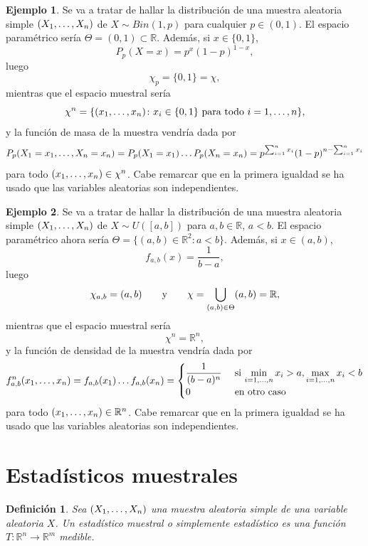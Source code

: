 \documentclass[11pt]{report}
\newtheorem{definition}{Definición}
\theoremstyle{definition}
\newtheorem{example}{Ejemplo}
\newcommand{\R}{\mathbb R}
\begin{document}
\begin{example}
Se va a tratar de hallar la distribución de una muestra aleatoria simple $(X_1,\mathellipsis,X_n)$ de $X \sim Bin(1,p)$ para cualquier $p \in (0,1)$. El espacio paramétrico sería $\Theta = (0,1) \subset \R$. Además, si $x \in \{0,1\}$,
\[P_p(X=x)=p^x(1-p)^{1-x},\]
luego
\[\chi_p = \{0,1\} = \chi,\]
mientras que el espacio muestral sería
\[\chi^n = \{(x_1,\mathellipsis,x_n) \colon x_i \in \{0,1\} \textup{ para todo } i =1,\mathellipsis,n\},\]
y la función de masa de la muestra vendría dada por
\[P_p(X_1=x_1,\mathellipsis,X_n=x_n) = P_p(X_1=x_1)\mathellipsis P_p(X_n=x_n) = p^{\sum_{i=1}^n x_i}(1-p)^{n-\sum_{i=1}^nx_i}\]
para todo $(x_1,\mathellipsis,x_n) \in \chi^n$. Cabe remarcar que en la primera igualdad se ha usado que las variables aleatorias son independientes.
\end{example}

\begin{example}
Se va a tratar de hallar la distribución de una muestra aleatoria simple $(X_1,\mathellipsis,X_n)$ de $X \sim U([a,b])$ para $a,b\in \R$, $a<b$. El espacio paramétrico ahora sería $\Theta = \{(a,b) \in \R^2 \colon a<b\}$. Además, si $x \in (a,b)$,
\[f_{a,b}(x)=\frac{1}{b-a},\]
luego
\[\chi_{a,b} = (a,b) \qquad \textup{y} \qquad \chi = \bigcup_{(a,b) \in \Theta} (a,b) = \R,\]
mientras que el espacio muestral sería
\[\chi^n = \R^n,\]
y la función de densidad de la muestra vendría dada por
\[f_{a,b}^n(x_1,\mathellipsis,x_n) = f_{a,b}(x_1)\mathellipsis f_{a,b}(x_n) = \begin{cases}
    \displaystyle \frac{1}{(b-a)^n} & $ si $ \displaystyle \min_{i=1,\mathellipsis,n} x_i > a, \displaystyle \max_{i=1,\mathellipsis,n} x_i < b \\
    0 & $ en otro caso$
\end{cases}\]
para todo $(x_1,\mathellipsis,x_n) \in \R^n$. Cabe remarcar que en la primera igualdad se ha usado que las variables aleatorias son independientes.
\end{example}

\section{Estadísticos muestrales}

\begin{definition}
    Sea $(X_1,\mathellipsis,X_n)$ una muestra aleatoria simple de una variable aleatoria $X$. Un \emph{estadístico muestral} o simplemente \emph{estadístico} es una función $T \colon \R^n \to \R^m$ medible.
\end{definition}
\end{document}
